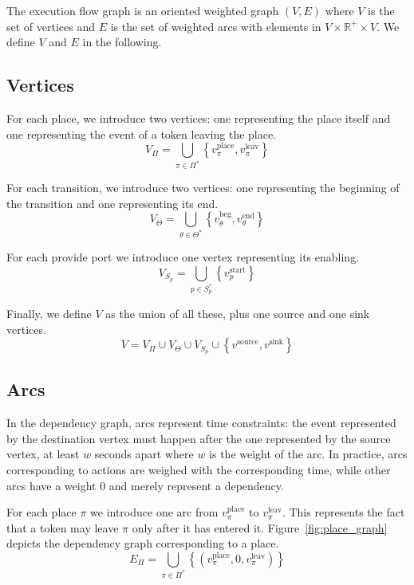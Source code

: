 The execution flow graph is an oriented weighted graph $\left(V,E\right)$
where $V$ is the set of vertices and $E$ is the set of weighted
arcs with elements in $V\times \mathbb{R}^{+} \times V$. We define
$V$ and $E$ in the following.

\subsection{Vertices}

For each place, we introduce two vertices: one representing the place
itself and one representing the event of a token leaving the place.
\[
V_{\Pi}=\bigcup_{\pi\in\Pi^*}\left\{ v_\pi^\text{place},v_\pi^\text{leav}\right\} 
\]

For each transition, we introduce two vertices: one representing the
beginning of the transition and one representing its end.
\[
V_{\Theta}=\bigcup_{\theta\in\Theta^*}\left\{ v_\theta^\text{beg},v_\theta^\text{end}\right\} 
\]

For each provide port we introduce one vertex representing its enabling.
\[
V_{S_p}=\bigcup_{p\in S_p^*} \left\{ v_p^\text{start}\right\} 
\]


Finally, we define $V$ as the union of all these, plus one source
and one sink vertices. 
\[
V=V_{\Pi}\cup V_{\Theta} \cup V_{S_p} \cup \left\{ v^\text{source},v^\text{sink}\right\} 
\]

\subsection{Arcs}

In the dependency graph, arcs represent time constraints: the event represented
by the destination vertex must happen after the one represented by the source
vertex, at least $w$ seconds apart where $w$ is the weight of the arc. In
practice, arcs corresponding to actions are weighed with the corresponding
time, while other arcs have a weight 0 and merely represent a dependency.

For each place $\pi$ we introduce one arc from $v_\pi^\text{place}$ to
$v_\pi^\text{leav}$. This represents the fact that a token may leave $\pi$
only after it has entered it.
Figure~\ref{fig:place_graph} depicts the dependency graph corresponding to a place.
\[
E_{\Pi}=\bigcup_{\pi\in\Pi^*}\left\{ \left(v_\pi^\text{place},0,v_\pi^\text{leav}\right)\right\} 
\]

